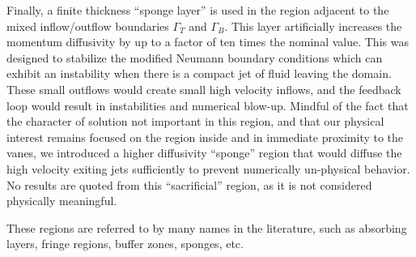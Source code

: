 Finally, a finite thickness ``sponge layer'' is used in the region adjacent 
to the mixed inflow/outflow boundaries $\Gamma_T$ and $\Gamma_B$.
This layer artificially increases the momentum diffusivity by
up to a factor of ten times the nominal value. This was designed to stabilize
the modified Neumann boundary conditions which can exhibit an instability
when there is a compact jet of fluid leaving the domain. 
These small outflows would create small high velocity inflows, and the
feedback loop would result in instabilities and numerical
blow-up. Mindful of the fact that the character of solution not
important in this region, and that our physical interest remains focused
on the region inside and in immediate proximity to the vanes, we
introduced a higher diffusivity ``sponge'' region that would diffuse the
high velocity exiting jets sufficiently to prevent numerically
un-physical behavior. No results are quoted from this ``sacrificial''
region, as it is not considered physically meaningful.

These regions are referred to by many names in the
literature\cite{doi:10.1146/annurev.fluid.36.050802.121930}, such as
absorbing layers, fringe regions, buffer zones, sponges,
etc.
